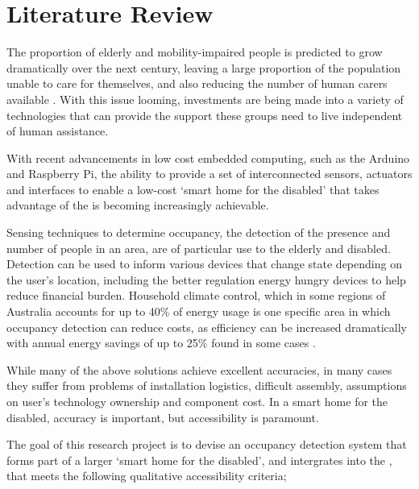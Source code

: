 \documentclass[../thesis/thesis.tex]{subfiles}
\begin{document}
\chapter{Literature Review}
\label{chap:litreview}

The proportion of elderly and mobility-impaired people is predicted to grow dramatically over the next century, leaving a large proportion of the population unable to care for themselves, and also reducing the number of human carers available \cite{chan2009smart}. With this issue looming, investments are being made into a variety of technologies that can provide the support these groups need to live independent of human assistance. 

With recent advancements in low cost embedded computing, such as the Arduino and Raspberry Pi, the ability to provide a set of interconnected sensors, actuators and interfaces to enable a low-cost `smart home for the disabled' that takes advantage of the \iot is becoming increasingly achievable.

Sensing techniques to determine occupancy, the detection of the presence and number of people in an area, are of particular use to the elderly and disabled. Detection can be used to inform various devices that change state depending on the user's location, including the better regulation energy hungry devices to help reduce financial burden. Household climate control, which in some regions of Australia accounts for up to 40\% of energy usage \cite{abs4602} is one specific area in which occupancy detection can reduce costs, as efficiency can be increased dramatically with annual energy savings of up to 25\% found in some cases \cite{beltran2013thermosense}.
 
While many of the above solutions achieve excellent accuracies, in many cases they suffer from problems of installation logistics, difficult assembly, assumptions on user's technology ownership and component cost. In a smart home for the disabled, accuracy is important, but accessibility is paramount.

The goal of this research project is to devise an occupancy detection system that forms part of a larger `smart home for the disabled', and intergrates into the \iot, that meets the following qualitative accessibility criteria;
\end{document}
